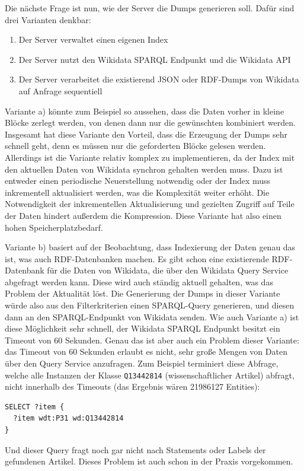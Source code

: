 Die nächste Frage ist nun, wie der Server die Dumps generieren soll. Dafür sind drei Varianten denkbar:
\begin{enumerate}[label=\alph*) ]
  \item Der Server verwaltet einen eigenen Index
  \item Der Server nutzt den Wikidata SPARQL Endpunkt und die Wikidata API
  \item Der Server verarbeitet die existierend JSON oder RDF-Dumps von Wikidata auf Anfrage sequentiell
\end{enumerate}
Variante a) könnte zum Beispiel so aussehen, dass die Daten vorher in kleine Blöcke zerlegt werden, von denen dann nur die gewünschten kombiniert werden.
Insgesamt hat diese Variante den Vorteil, dass die Erzeugung der Dumps sehr schnell geht, denn es müssen nur die geforderten Blöcke gelesen werden.
Allerdings ist die Variante relativ komplex zu implementieren, da der Index mit den aktuellen Daten von Wikidata synchron gehalten werden muss.
Dazu ist entweder einen periodische Neuerstellung notwendig oder der Index muss inkrementell aktualisiert werden, was die Komplexität weiter erhöht.
Die Notwendigkeit der inkrementellen Aktualisierung und gezielten Zugriff auf Teile der Daten hindert außerdem die Kompression.
Diese Variante hat also einen hohen Speicherplatzbedarf.

Variante b) basiert auf der Beobachtung, dass Indexierung der Daten genau das ist, was auch RDF-Datenbanken machen.
Es gibt schon eine existierende RDF-Datenbank für die Daten von Wikidata, die über den Wikidata Query Service abgefragt werden kann.
Diese wird auch ständig aktuell gehalten, was das Problem der Aktualität löst.
Die Generierung der Dumps in dieser Variante würde also aus den Filterkriterien einen SPARQL-Query generieren, und diesen dann an den SPARQL-Endpunkt von Wikidata senden.
Wie auch Variante a) ist diese Möglichkeit sehr schnell, der Wikidata SPARQL Endpunkt besitzt ein Timeout von 60 Sekunden.
Genau das ist aber auch ein Problem dieser Variante: das Timeout von 60 Sekunden erlaubt es nicht, sehr große Mengen von Daten über den Query Service anzufragen. Zum Beispiel terminiert diese Abfrage, welche alle Instanzen der Klasse \verb|Q13442814| (wissenschaftlicher Artikel) abfragt, nicht innerhalb des Timeouts (das Ergebnis wären 21986127 Entities):
\begin{lstlisting}[language=SPARQL, caption=SPARQL-Query nach wissenschaftlichen Artikeln]
SELECT ?item {
  ?item wdt:P31 wd:Q13442814
} 
\end{lstlisting}
Und dieser Query fragt noch gar nicht nach Statements oder Labels der gefundenen Artikel.
Dieses Problem ist auch schon in der Praxis vorgekommen\cite{wd-wk-common-references}.

